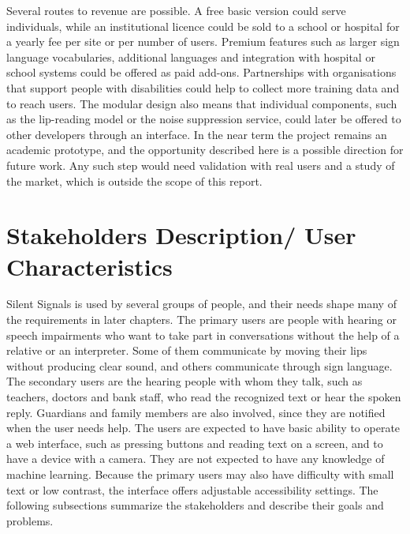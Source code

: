 \documentclass{FastFyp}
\begin{document}
Several routes to revenue are possible. A free basic version could serve individuals, while an institutional licence could be sold to a school or hospital for a yearly fee per site or per number of users. Premium features such as larger sign language vocabularies, additional languages and integration with hospital or school systems could be offered as paid add-ons. Partnerships with organisations that support people with disabilities could help to collect more training data and to reach users. The modular design also means that individual components, such as the lip-reading model or the noise suppression service, could later be offered to other developers through an interface. In the near term the project remains an academic prototype, and the opportunity described here is a possible direction for future work. Any such step would need validation with real users and a study of the market, which is outside the scope of this report.

\section{Stakeholders Description/ User Characteristics}
Silent Signals is used by several groups of people, and their needs shape many of the requirements in later chapters. The primary users are people with hearing or speech impairments who want to take part in conversations without the help of a relative or an interpreter. Some of them communicate by moving their lips without producing clear sound, and others communicate through sign language. The secondary users are the hearing people with whom they talk, such as teachers, doctors and bank staff, who read the recognized text or hear the spoken reply. Guardians and family members are also involved, since they are notified when the user needs help. The users are expected to have basic ability to operate a web interface, such as pressing buttons and reading text on a screen, and to have a device with a camera. They are not expected to have any knowledge of machine learning. Because the primary users may also have difficulty with small text or low contrast, the interface offers adjustable accessibility settings. The following subsections summarize the stakeholders and describe their goals and problems.
\end{document}
